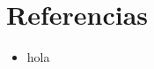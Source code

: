 \documentclass[spanish, a4paper, 11pt]{article}
\begin{document}
\clearpage


\clearpage






\clearpage
\section{Referencias}
\begin{itemize}
\item hola
\end{itemize}
\end{document}
